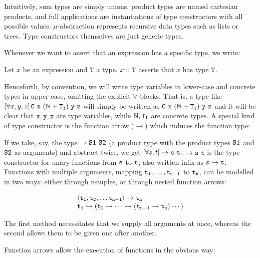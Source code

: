 Intuitively, sum types are simply unions, product types are named cartesian products, and full applications are instantiations of type constructors with all possible values. $\mu$-abstraction represents recursive data types such as lists or trees. Type constructors themselves are just generic types.

Whenever we want to assert that an expression has a specific type, we write:

\begin{notation}
	Let $x$ be an expression and $\mathtt{T}$ a type. $x :: \mathtt{T}$ asserts that $x$ has type $\mathtt{T}$.
\end{notation}

Henceforth, by convention, we will write type variables in lower-case and concrete types in upper-case, omitting the explicit $\forall$-blocks. That is, a type like $\allQ{x,y,z} \type{C\ x\ (\N + T_1)\ y\ z}$ will simply be written as $\mathtt{C\ x\ (\mathbb{N} + T_1)\ y\ z}$ and it will be clear that $\mathtt{x}, \mathtt{y}, \mathtt{z}$ are type variables, while $\mathbb{N}, \mathtt{T_1}$ are concrete types. A special kind of type constructor is the function arrow ($\rightarrow$) which induces the function type:

\begin{example}
	If we take, say, the type $\rightarrow \mathtt{S1}\ \mathtt{S2}$ (a product type with the product types $\mathtt{S1}$ and $\mathtt{S2}$ as arguments) and abstract twice, we get $\allQ{s,t} \rightarrow \type{s}\ \type{t}$. $\rightarrow \type{s}\ \type{t}$ is the type constructor for unary functions from $\mathtt{s}$ to $\mathtt{t}$, also written infix as $\mathtt{s} \rightarrow \mathtt{t}$. Functions with multiple arguments, mapping $\mathtt{t_1},\dots,\mathtt{t_{n-1}}$ to $\mathtt{t_n}$, can be modelled in two ways: either through n-tuples, or through nested function arrows:
	
	$$
	\begin{array}{l}
	\langle \mathtt{t_1}, \mathtt{t_2}, \dots \mathtt{t_{n-1}} \rangle \rightarrow \mathtt{t_n}\\
	\mathtt{t_1} \rightarrow (\mathtt{t_2} \rightarrow \dots \rightarrow (\mathtt{t_{n-1}} \rightarrow \mathtt{t_n})\cdots)
	\end{array}
	$$
	
	The first method necessitates that we supply all arguments at once, whereas the second allows them to be given one after another.
\end{example}

\noindent
Function arrows allow the execution of functions in the obvious way:

